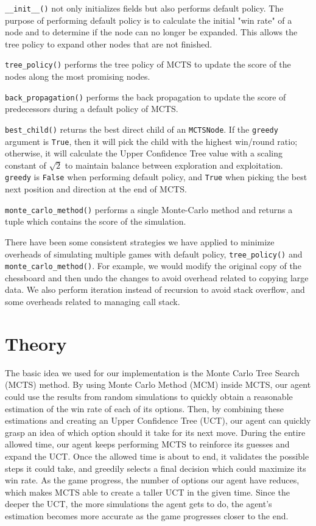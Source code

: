 \documentclass[twoside,11pt]{article}
\begin{document}
\texttt{\_\_init\_\_()} not only initializes fields but also performs default policy.
The purpose of performing default policy is to calculate the initial "win rate" of a node and to determine if the node can no longer be expanded.
This allows the tree policy to expand other nodes that are not finished.

\texttt{tree\_policy()} performs the tree policy of MCTS to update the score of the nodes along the most promising nodes.

\texttt{back\_propagation()} performs the back propagation to update the score of predecessors during a default policy of MCTS.

\texttt{best\_child()} returns the best direct child of an \texttt{MCTSNode}.
If the \texttt{greedy} argument is \texttt{True}, then it will pick the child with the highest win/round ratio;
otherwise, it will calculate the Upper Confidence Tree value with a scaling constant of \(\sqrt{2}\) to maintain balance between exploration and exploitation.
\texttt{greedy} is \texttt{False} when performing default policy, and \texttt{True} when picking the best next position and direction at the end of MCTS.

\texttt{monte\_carlo\_method()} performs a single Monte-Carlo method and returns a tuple which contains the score of the simulation.

There have been some consistent strategies we have applied to minimize overheads of simulating multiple games with default policy, \texttt{tree\_policy()} and \texttt{monte\_carlo\_method()}.
For example, we would modify the original copy of the chessboard and then undo the changes to avoid overhead related to copying large data.
We also perform iteration instead of recursion to avoid stack overflow, and some overheads related to managing call stack.

\section{Theory}
The basic idea we used for our implementation is the Monte Carlo Tree Search (MCTS) method.
By using Monte Carlo Method (MCM) inside MCTS, our agent could use the results from random simulations to quickly obtain a reasonable estimation of the win rate of each of its options.
Then, by combining these estimations and creating an Upper Confidence Tree (UCT), our agent can quickly grasp an idea of which option should it take for its next move.
During the entire allowed time, our agent keeps performing MCTS to reinforce its guesses and expand the UCT.
Once the allowed time is about to end, it validates the possible steps it could take, and greedily selects a final decision which could maximize its win rate.
As the game progress, the number of options our agent have reduces, which makes MCTS able to create a taller UCT in the given time. 
Since the deeper the UCT, the more simulations the agent gets to do, the agent's estimation becomes more accurate as the game progresses closer to the end.
\end{document}
